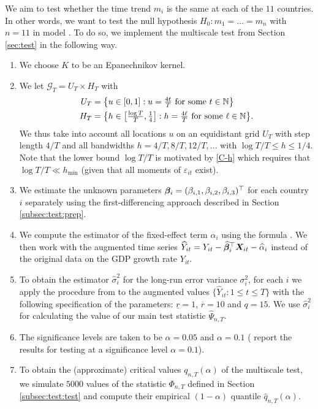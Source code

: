 \documentclass[a4paper,12pt]{article}
\makeatletter
\renewcommand{\eqref}[1]{\tagform@{\ref{#1}}}
\makeatother
\begin{document}
We aim to test whether the time trend $m_i$ is the same at each of the $11$ countries. In other words, we want to test the null hypothesis $H_0: m_1 = \ldots = m_n$ with $n = 11$ in model \eqref{eq:model:app2}. To do so, we implement the multiscale test from Section \ref{sec:test} in the following way. 

\begin{enumerate}
\item We choose $K$ to be an Epanechnikov kernel.
\item We let $\mathcal{G}_T = U_T \times H_T$ with 
\begin{align*}
U_T & = \big\{ u \in [0,1]: u = \textstyle{\frac{4t}{T}} \text{ for some } t \in \mathbb{N} \big\} \\
H_T & = \big\{ h \in \big[ \textstyle{\frac{\log T}{T}}, \textstyle{\frac{1}{4}} \big]:  h = \textstyle{\frac{4\ell}{T}} \text{ for some } \ell \in \mathbb{N} \big\}. 
\end{align*}
We thus take into account all locations $u$ on an equidistant grid $U_T$ with step length $4/T$ and all bandwidths $h=4/T, 8/T, 12/T,\ldots$ with $\log T /T \le h \le 1/4$. Note that the lower bound $\log T / T$ is motivated by \ref{C-h} which requires that $\log T /T \ll h_{\min}$ (given that all moments of $\varepsilon_{it}$ exist).
\item We estimate the unknown parameters $\bm{\beta}_i = (\beta_{i, 1}, \beta_{i, 2}, \beta_{i, 3})^\top$ for each country $i$ separately using the first-differencing approach described in Section \ref{subsec:test:prep}.
\item We compute the estimator of the fixed-effect term $\alpha_i$ using the formula \eqref{eq:alpha:est}. We then work with the augmented time series $\widehat{Y}_{it} = Y_{it} - \widehat{\bm{\beta}}_i^\top \boldsymbol{X}_{it} - \widehat{\alpha}_{i}$ instead of the original data on the GDP growth rate $Y_{it}$.
\item To obtain the estimator $\hat{\sigma}_i^2$ for the long-run error variance $\sigma^2_i$, for each $i$ we apply the procedure from \cite{KhismatullinaVogt2020} to the augmented values \linebreak $\{\widehat{Y}_{it}: 1\leq t \leq T\}$ with the following specification of the parameters: $\underline{r}=1$, $\overline{r}=10$ and $q = 15$. We use $\hat{\sigma}^2_i$ for calculating the value of our main test statistic $\widehat{\Psi}_{n, T}$. %
\item The significance levels are taken to be $\alpha = 0.05$ and $\alpha = 0.1$ (\citet{Zhang2012} report the results for testing at a significance level $\alpha = 0.1$).
\item To obtain the (approximate) critical values $q_{n, T}(\alpha)$ of the multiscale test, we simulate $5000$ values of the statistic $\Phi_{n, T}$ defined in Section \ref{subsec:test:test} and compute their empirical $(1-\alpha)$ quantile $\hat{q}_{n, T}(\alpha)$.
\end{enumerate}
\end{document}
